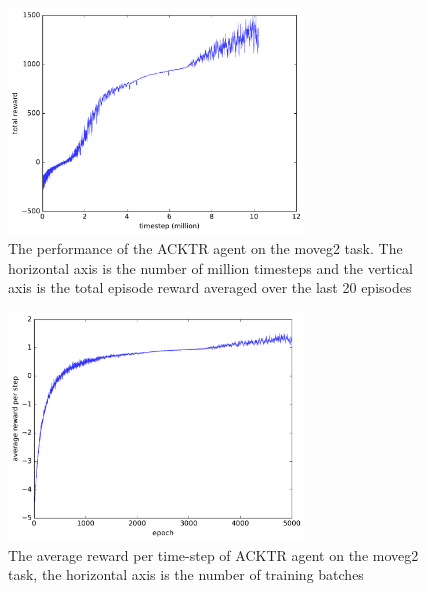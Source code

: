 \begin{figure}[!htbp]
	\includegraphics[width=0.7\textwidth]{images/rec_180528_statlog.pdf}
	\centering
	\caption{The performance of the ACKTR agent on the moveg2 task. The horizontal axis is the number of million timesteps and the vertical axis is the total episode reward averaged over the last 20 episodes}\label{rec_stat_moveg2}
\end{figure}

\begin{figure}[!htbp]
	\includegraphics[width=0.7\textwidth]{images/rec_180528_meanrt_statlog.pdf}
	\centering
	\caption{The average reward per time-step of ACKTR agent on the moveg2 task, the horizontal axis is the number of training batches}\label{rec_stat_moveg2_meanrt}
\end{figure}

